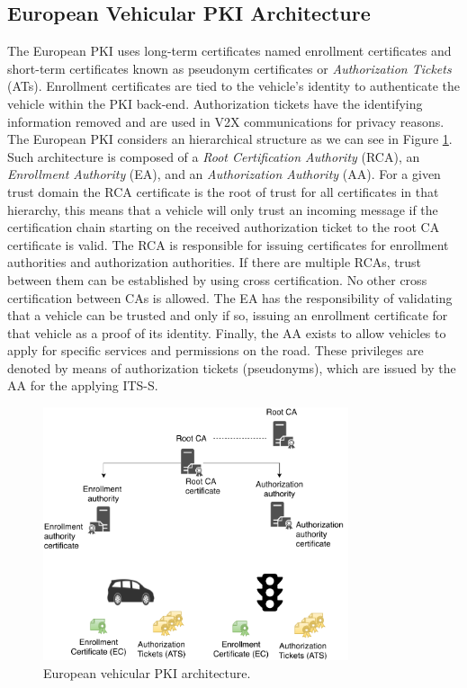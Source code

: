 \subsection{European Vehicular PKI Architecture}
\label{section:european_pki}

The European PKI uses long-term certificates named enrollment certificates and short-term certificates known as pseudonym certificates or \textit{Authorization Tickets} (ATs). Enrollment certificates are tied to the vehicle's identity to authenticate the vehicle within the PKI back-end. Authorization tickets have the identifying information removed and are used in V2X communications for privacy reasons. The European PKI considers an hierarchical structure as we can see in Figure \ref{fig:ETSI_PKI}. Such architecture is composed of a \textit{Root Certification Authority} (RCA), an \textit{Enrollment Authority} (EA), and an \textit{Authorization Authority} (AA). For a given trust domain the RCA certificate is the root of trust for all certificates in that hierarchy, this means that a vehicle will only trust an incoming message if the certification chain starting on the received authorization ticket to the root CA certificate is valid. The RCA is responsible for issuing certificates for enrollment authorities and authorization authorities. If there are multiple RCAs, trust between them can be established by using cross certification. No other cross certification between CAs is allowed. The EA has the responsibility of validating that a vehicle can be trusted and only if so, issuing an enrollment certificate for that vehicle as a proof of its identity. Finally, the AA exists to allow vehicles to apply for specific services and permissions on the road. These privileges are denoted by means of authorization tickets (pseudonyms), which are issued by the AA for the applying ITS-S.



\begin{figure}
	\centering
	\includegraphics[width=0.8\textwidth]{Figures/ETSI_PKI.pdf}
	\caption{\label{fig:ETSI_PKI}European vehicular PKI architecture.}
\end{figure}

